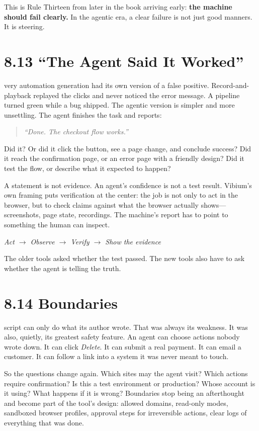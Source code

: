 \documentclass[11pt, a4paper, openany]{book}
\newcommand{\initialcap}[1]{{\fontfamily{lmss}\selectfont\huge\textbf{#1}}}
\begin{document}
This is Rule Thirteen from later in the book arriving early: \textbf{the machine should fail clearly.} In the agentic era, a clear failure is not just good manners. It is steering.

\section{8.13 ``The Agent Said It Worked''}
\noindent \initialcap{E}very automation generation had its own version of a false positive. Record-and-playback replayed the clicks and never noticed the error message. A pipeline turned green while a bug shipped. The agentic version is simpler and more unsettling. The agent finishes the task and reports:
\begin{quote}
\textit{``Done. The checkout flow works.''}
\end{quote}
Did it? Or did it click the button, see a page change, and conclude success? Did it reach the confirmation page, or an error page with a friendly design? Did it test the flow, or describe what it expected to happen?

A statement is not evidence. An agent's confidence is not a test result. Vibium's own framing puts verification at the center: the job is not only to act in the browser, but to check claims against what the browser actually shows---screenshots, page state, recordings. The machine's report has to point to something the human can inspect.
\begin{center}
\textit{Act $\rightarrow$ Observe $\rightarrow$ Verify $\rightarrow$ Show the evidence}
\end{center}
The older tools asked whether the test passed. The new tools also have to ask whether the agent is telling the truth.

\section{8.14 Boundaries}
\noindent \initialcap{A} script can only do what its author wrote. That was always its weakness. It was also, quietly, its greatest safety feature. An agent can choose actions nobody wrote down. It can click \textit{Delete}. It can submit a real payment. It can email a customer. It can follow a link into a system it was never meant to touch.

So the questions change again. Which sites may the agent visit? Which actions require confirmation? Is this a test environment or production? Whose account is it using? What happens if it is wrong? Boundaries stop being an afterthought and become part of the tool's design: allowed domains, read-only modes, sandboxed browser profiles, approval steps for irreversible actions, clear logs of everything that was done.
\end{document}
